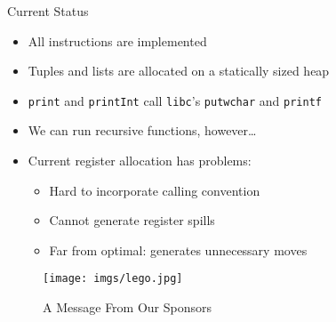 \documentclass[department=icis, slidenumbers=slide, official=true]{beamerruhuisstijl}
\begin{document}
\begin{frame}{Current Status}
    \begin{itemize}[<+->]
        \item All instructions are implemented
        \item Tuples and lists are allocated on a statically sized heap
        \item \texttt{print} and \texttt{printInt} call \texttt{libc}'s \texttt{putwchar} and \texttt{printf}
        \item We can run recursive functions, however\ldots
        \item Current register allocation has problems:
            \begin{itemize}
                \item Hard to incorporate calling convention
                \item Cannot generate register spills
                \item Far from optimal: generates unnecessary moves
            \end{itemize}
    \end{itemize}
\end{frame}

\begin{frame}
    \begin{figure}[h]
        \centering
        \texttt{[image: imgs/lego.jpg]}
        \caption{A Message From Our Sponsors}\label{fig:lego}
    \end{figure}
\end{frame}
\end{document}
